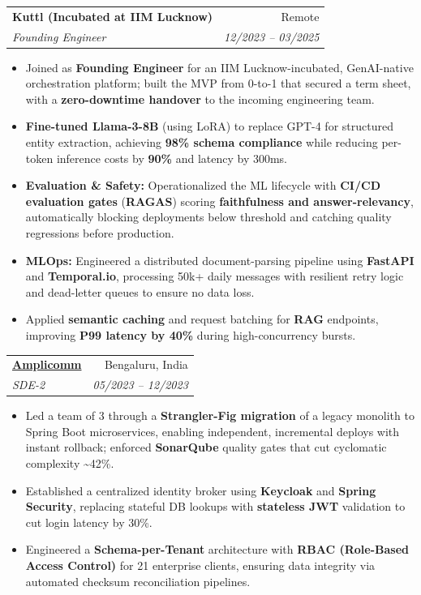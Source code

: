 \documentclass[11pt,a4paper]{article}
\makeatletter
\newcommand{\resumeItem}[1]{
  \item\small{
    {#1 \vspace{-2pt}}
  }
}
\newcommand{\resumeSubheading}[4]{
  \vspace{-1pt}\item
    \begin{tabular*}{0.97\textwidth}[t]{l@{\extracolsep{\fill}}r}
      \textbf{#1} & #2 \\
      \textit{\small#3} & \textit{\small #4} \\
    \end{tabular*}\vspace{-5pt}
}
\newcommand{\resumeItemListStart}{\begin{itemize}[itemsep=2pt, topsep=0pt, partopsep=0pt]}
\newcommand{\resumeItemListEnd}{\end{itemize}\vspace{-5pt}}
\makeatother
\begin{document}
    \resumeSubheading
      {Kuttl (Incubated at IIM Lucknow)}{Remote}
      {Founding Engineer}{12/2023 -- 03/2025}
      \resumeItemListStart
        \resumeItem{Joined as \textbf{Founding Engineer} for an IIM Lucknow-incubated, GenAI-native orchestration platform; built the MVP from 0-to-1 that secured a term sheet, with a \textbf{zero-downtime handover} to the incoming engineering team.}
        \resumeItem{\textbf{Fine-tuned Llama-3-8B} (using LoRA) to replace GPT-4 for structured entity extraction, achieving \textbf{98\% schema compliance} while reducing per-token inference costs by \textbf{90\%} and latency by 300ms.}
        \resumeItem{\textbf{Evaluation \& Safety:} Operationalized the ML lifecycle with \textbf{CI/CD evaluation gates} (\textbf{RAGAS}) scoring \textbf{faithfulness and answer-relevancy}, automatically blocking deployments below threshold and catching quality regressions before production.}
        \resumeItem{\textbf{MLOps:} Engineered a distributed document-parsing pipeline using \textbf{FastAPI} and \textbf{Temporal.io}, processing 50k+ daily messages with resilient retry logic and dead-letter queues to ensure no data loss.}
        \resumeItem{Applied \textbf{semantic caching} and request batching for \textbf{RAG} endpoints, improving \textbf{P99 latency by 40\%} during high-concurrency bursts.}
      \resumeItemListEnd

    \resumeSubheading
      {\href{https://amplicomm.com/}{Amplicomm}}{Bengaluru, India}
      {SDE-2}{05/2023 -- 12/2023}
      \resumeItemListStart
        \resumeItem{Led a team of 3 through a \textbf{Strangler-Fig migration} of a legacy monolith to Spring Boot microservices, enabling independent, incremental deploys with instant rollback; enforced \textbf{SonarQube} quality gates that cut cyclomatic complexity \textasciitilde{}42\%.}
        \resumeItem{Established a centralized identity broker using \textbf{Keycloak} and \textbf{Spring Security}, replacing stateful DB lookups with \textbf{stateless JWT} validation to cut login latency by 30\%.}
        \resumeItem{Engineered a \textbf{Schema-per-Tenant} architecture with \textbf{RBAC (Role-Based Access Control)} for 21 enterprise clients, ensuring data integrity via automated checksum reconciliation pipelines.}
      \resumeItemListEnd
\end{document}
